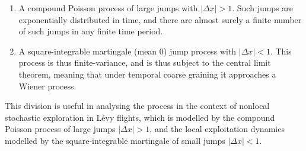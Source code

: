 \begin{enumerate}
	\item A compound Poisson process of large jumps with $|\Delta x| > 1$. Such jumps are exponentially distributed in time, and there are almost surely a finite number of such jumps in any finite time period.
	\item A square-integrable martingale (mean 0) jump process with $|\Delta x| < 1$. This process is thus finite-variance, and is thus subject to the central limit theorem, meaning that under temporal coarse graining it approaches a Wiener process.
\end{enumerate}
This division is useful in analysing the process in the context of nonlocal stochastic exploration in Lévy flights, which is modelled by the compound Poisson process of large jumps $|\Delta x| > 1$, and the local exploitation dynamics modelled by the square-integrable martingale of small jumps $|\Delta x| < 1$.